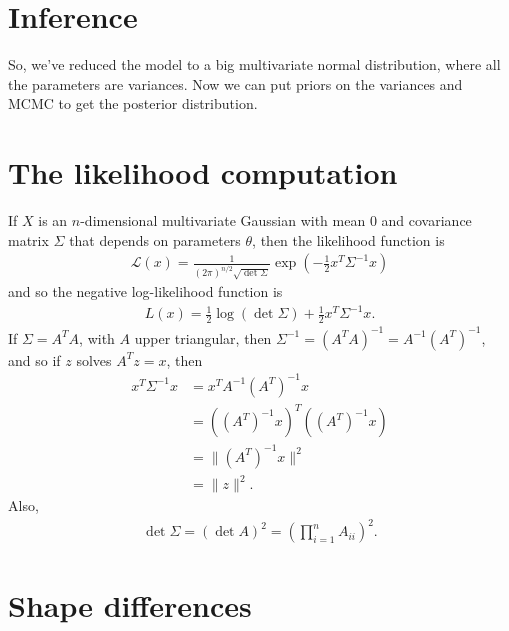 \documentclass{article}
\begin{document}
\section{Inference}

So, we've reduced the model to a big multivariate normal distribution,
where all the parameters are variances.
Now we can put priors on the variances and MCMC to get the posterior distribution.


\section{The likelihood computation}

If $X$ is an $n$-dimensional multivariate Gaussian with mean 0 and covariance matrix $\Sigma$ that depends on parameters $\theta$,
then the likelihood function is
\begin{align}
  \mathcal{L}(x) = \frac{1}{ (2 \pi)^{n/2} \sqrt{ \det \Sigma } } \exp \left( - \frac{1}{2} x^T \Sigma^{-1} x \right)
\end{align}
and so the negative log-likelihood function is
\begin{align}
  L(x) = \frac{1}{2} \log \left( \det \Sigma \right) + \frac{1}{2} x^T \Sigma^{-1} x  .
\end{align}
If $\Sigma = A^T A$, with $A$ upper triangular, then $\Sigma^{-1} = (A^T A)^{-1} = A^{-1} (A^T)^{-1}$, and so
if $z$ solves $A^T z = x$, then
\begin{align}
  x^T \Sigma^{-1} x &= x^T A^{-1} (A^T)^{-1} x \\
  &= ( (A^T)^{-1} x )^T ( (A^T)^{-1} x ) \\
  &= \| (A^T)^{-1} x \|^2 \\
  &= \|z\|^2  .
\end{align}
Also, 
\begin{align}
  \det \Sigma = (\det A )^2 = \left( \prod_{i=1}^n A_{ii} \right)^2 .
\end{align}


\section{Shape differences}
\end{document}
